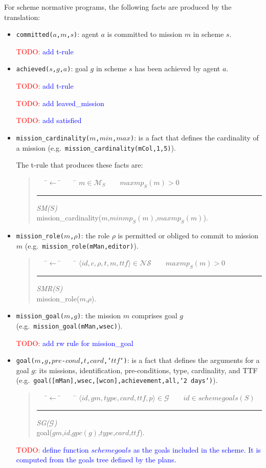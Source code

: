 \documentclass{article}
\newcommand{\todo}[1]{\textcolor{red}{TODO: }\textcolor{blue}{#1}}
\newcommand{\set}[1]{\mathcal{#1}}
\newcommand{\andalso}{\quad\quad}
\newcommand{\code}[1]{\texttt{#1}}
\newenvironment{rwrule}[2]
{\begin{quote}\ttfamily\begin{tabbing}~~~\=$\leftarrow$ \= ~~~ \= \kill
     \ensuremath{#2}\\
     \rule[2pt]{6.5cm}{.3pt} \hfill \rwlabel{#1}\\}
{\end{tabbing}\end{quote}}
\newcommand{\rwlabel}[1]{{\scshape\itshape\textrm{#1}}}
\theoremstyle{definition} \newtheorem{definition}{Definition}
\begin{document}
For scheme normative programs, the following facts are
produced by the translation:
\begin{itemize}

\item \code{committed($a$,$m$,$s$)}: agent $a$ is committed to mission
  $m$ in scheme $s$.

  \todo{add t-rule}

\item \code{achieved($s$,$g$,$a$)}: goal $g$ in scheme $s$ has been
  achieved by agent $a$.

  \todo{add t-rule}

  \todo{add leaved\_mission}

  \todo{add satisfied}



\item \code{mission\_cardinality($m$,$min$,$max$)}: is a fact that defines
  the cardinality of a mission (e.g.\
  \code{mission\_cardinality(mCol,1,5)}).

  The t-rule that produces these facts are:

  \begin{rwrule}{SM($S$)}
    {m \in \set{M}_S \andalso maxmp_S(m) > 0}
    mission\_cardinality($m$,$minmp_S(m)$,$maxmp_S(m)$).
  \end{rwrule}

\item \code{mission\_role($m$,$\rho$)}: the role $\rho$ is permitted
  or obliged to commit to mission $m$ (e.g.\
  \code{mission\_role(mMan,editor)}).

  \begin{rwrule}{SMR($S$)}
    {\langle id, c, \rho, t, m, ttf \rangle \in \set{NS} \andalso maxmp_S(m) > 0}
    mission\_role($m$,$\rho$).
  \end{rwrule}

\item \code{mission\_goal($m$,$g$)}: the mission $m$ comprises goal
  $g$ (e.g.\ \code{mission\_goal(mMan,wsec)}).

\todo{add rw rule for mission\_goal}

\item \code{goal($m$,$g$,$pre$-$cond$,$t$,$card$,`$ttf$`)}: is a fact
  that defines the arguments for a goal $g$: its missions,
  identification, pre-conditions, type, cardinality, and TTF (e.g.\
  \code{goal([mMan],wsec,[wcon],achievement,all,`2 days`)}).

  \begin{rwrule}{SG($\set{G}$)}
    {\langle id, gm, type, card, ttf, p \rangle \in \set{G} \andalso id \in schemegoals(S)}
    goal($gm$,$id$,$gpc(g)$,$type$,$card$,$ttf$).
  \end{rwrule}

  \todo{define function $schemegoals$ as the goals included in the
    scheme. It is computed from the goals tree defined by the plans.}
\end{itemize}
\end{document}
